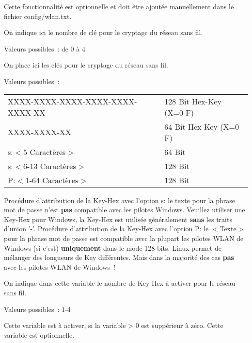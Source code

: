 \begin{description}
      Cette fonctionnalité est optionnelle et doit être ajoutée manuellement
      dans le fichier config/wlan.txt.


      On indique ici le nombre de clé pour le cryptage du réseau sans fil.

      Valeurs possibles~: de 0 à 4


      On place ici les clés pour le cryptage du réseau sans fil.

      Valeurs possibles~:

        \begin{tabular}[h]{ll}
        XXXX-XXXX-XXXX-XXXX-XXXX-XXXX-XX &       128 Bit Hex-Key (X=0-F) \\
        XXXX-XXXX-XX                     &        64 Bit Hex-Key (X=0-F) \\
        s:$<$5 Caractères$>$             &        64 Bit \\
        s:$<$6-13 Caractères$>$          &       128 Bit \\
        P:$<$1-64 Caractères$>$          &       128 Bit \\
        \end{tabular}

      Procédure d'attribution de la Key-Hex avec l'option s: le texte pour la
      phrase mot de passe n'est \textbf{pas} compatible avec les pilotes Windows.
      Veuillez utiliser une Key-Hex pour Windows, la Key-Hex est utilisée
      généralement \textbf{sans} les traits d'union '-'. Procédure d'attribution de
      la Key-Hex avec l'option P: le $<$Texte$>$ pour la phrase mot de passe est
      compatible avec la plupart les pilotes WLAN de Windows (si c'est)
      \textbf{uniquement} dans le mode 128 bits. Linux permet de mélanger des longueurs
      de Key différentes. Mais dans la majorité des cas \textbf{pas} avec les pilotes
      WLAN de Windows~!


      On indique dans cette variable le nombre de Key-Hex à activer
      pour le réseau sans fil.

      Valeurs possibles~: 1-4

     Cette variable est à activer, si la variable  > 0 est
     suppérieur à zéro. Cette variable est optionnelle.


\end{description}
